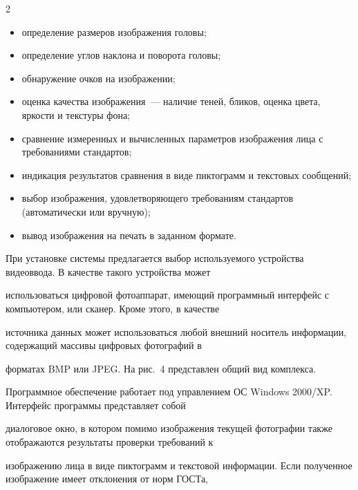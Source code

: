 \begin{multicols}{2}
\begin{itemize}
\item определение размеров изображения головы;


\item определение углов наклона и поворота головы;


\item обнаружение очков на изображении;


\item оценка качества изображения~--- наличие теней, бликов, оценка цвета, яркости и текстуры фона;


\item сравнение измеренных и вычисленных па\-ра\-мет\-ров изображения лица с требованиями стандартов;


\item индикация результатов сравнения в виде пиктограмм и текстовых сообщений;


\item выбор изображения, удовлетворяющего требованиям стандартов (автоматически или вручную);


\item вывод изображения на печать в заданном формате.


\end{itemize}








При установке системы предлагается выбор используемого устройства видеоввода. В качестве такого устройства может 


использоваться цифровой фотоаппарат, имеющий программный интерфейс с компьютером, или сканер. Кроме этого, в качестве 


источника данных может использоваться любой внешний носитель информации, содержащий массивы цифровых фотографий в 


форматах BMP или JPEG. На рис.~4 представлен общий вид комплекса.








Программное обеспечение работает под управ\-лением ОС Windows 2000/XP. Интерфейс программы представляет собой 


диалоговое окно, в котором помимо изображения текущей фотографии также отображаются результаты проверки требований к 


изображению лица в виде пиктограмм и текстовой информации. Если полученное изображение имеет отклонения от норм ГОСТа, 



\end{multicols}
